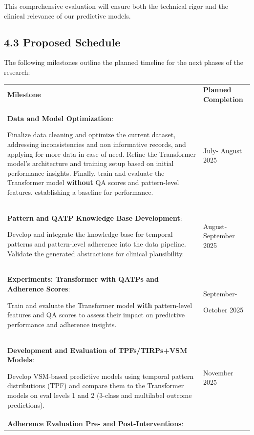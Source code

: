 \documentclass[
]{article}
\newcounter{none} %
\begin{document}
This comprehensive evaluation will ensure both the technical rigor and
the clinical relevance of our predictive models.

\subsection{4.3 Proposed Schedule}\label{proposed-schedule}

The following milestones outline the planned timeline for the next
phases of the research:

{\def\LTcaptype{none} %
\begin{longtable}[]{@{}
  >{\raggedright\arraybackslash}p{}
  >{\raggedright\arraybackslash}p{}@{}}
\toprule\noalign{}
\endhead
\bottomrule\noalign{}
\endlastfoot
\textbf{Milestone} & \textbf{Planned Completion} \\
\textbf{Data and Model Optimization}:

Finalize data cleaning and optimize the current dataset, addressing
inconsistencies and non informative records, and applying for more data
in case of need. Refine the Transformer model's architecture and
training setup based on initial performance insights. Finally, train and
evaluate the Transformer model \textbf{without} QA scores and
pattern-level features, establishing a baseline for performance. & July-
August 2025 \\
\textbf{Pattern and QATP Knowledge Base Development}:

Develop and integrate the knowledge base for temporal patterns and
pattern-level adherence into the data pipeline. Validate the generated
abstractions for clinical plausibility. & August- September 2025 \\
\textbf{Experiments: Transformer with QATPs and Adherence Scores}:

Train and evaluate the Transformer model \textbf{with} pattern-level
features and QA scores to assess their impact on predictive performance
and adherence insights. & September-

October 2025 \\
\textbf{Development and Evaluation of TPFs/TIRPs+VSM Models}:

Develop VSM-based predictive models using temporal pattern distributions
(TPF) and compare them to the Transformer models on eval levels 1 and 2
(3-class and multilabel outcome predictions). & November 2025 \\
\textbf{Adherence Evaluation Pre- and Post-Interventions}:


\end{longtable}}
\end{document}
